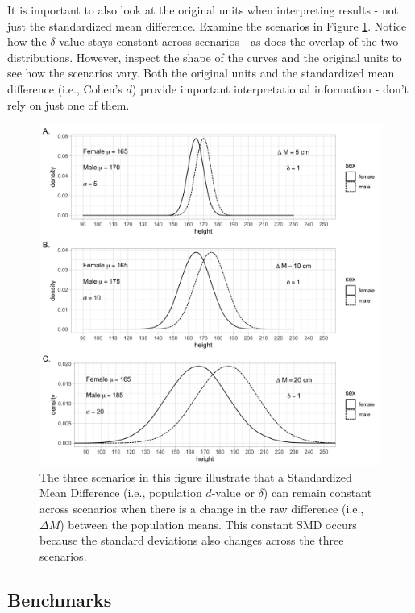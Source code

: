 \documentclass[
]{krantz}
\begin{document}
It is important to also look at the original units when interpreting results - not just the standardized mean difference. Examine the scenarios in Figure \ref{fig:dex3}. Notice how the \(\delta\) value stays constant across scenarios - as does the overlap of the two distributions. However, inspect the shape of the curves and the original units to see how the scenarios vary. Both the original units and the standardized mean difference (i.e., Cohen's \(d\)) provide important interpretational information - don't rely on just one of them.

\begin{figure}
\includegraphics[width=1\linewidth]{ch_populations/images/dvalue_ex3} \caption{The three scenarios in this figure illustrate that a Standardized Mean Difference (i.e., population $d$-value or $\delta$) can remain constant across scenarios when there is a change in the raw difference (i.e., $\Delta M$) between the population means. This constant SMD occurs because the standard deviations also changes across the three scenarios.}\label{fig:dex3}
\end{figure}

\hypertarget{benchmarks}{%
\subsection{Benchmarks}\label{benchmarks}}
\end{document}
